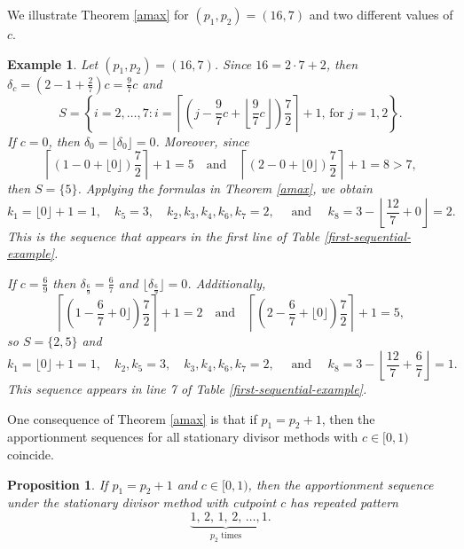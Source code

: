 \documentclass[pdflatex,sn-mathphys-num]{sn-jnl}
\theoremstyle{thmstyleone}%
\newtheorem{proposition}{Proposition}%
\theoremstyle{thmstyletwo}%
\newtheorem{example}{Example}%
\theoremstyle{thmstylethree}%
\begin{document}
 We illustrate Theorem \ref{amax} for $(p_1, p_2)=(16,7)$ and two different values of $c$.
 
 \begin{example}
Let $(p_1, p_2)=(16,7)$. Since $16 = 2 \cdot 7+2$, then $\delta_c =\left(2-1+ \frac{2}{7}\right)c = \frac{9}{7}c$ and 
$$S = \left\{i = 2, \ldots, 7 : i = \left\lceil \left(j- \textstyle\frac{9}{7}c+ \left\lfloor  \textstyle\frac{9}{7}c \right\rfloor \right)\textstyle\frac{7}{2} \right\rceil + 1 \mbox{, for  } j = 1, 2\right\}.$$
If $c=0$, then $\delta_0 = \lfloor \delta_0 \rfloor=0$. Moreover, since
$$ \left\lceil (1- 0+ \lfloor  0 \rfloor)\textstyle\frac{7}{2} \right\rceil+1 = 5 \quad \mbox{and} \quad   \left\lceil (2-0+ \lfloor  0 \rfloor)\textstyle\frac{7}{2} \right\rceil+1=8>7, $$
then $S = \{5\}$. 
  Applying the formulas in Theorem \ref{amax}, we obtain
 $$k_1  = \lfloor  0 \rfloor + 1=1, \quad  k_5=3, \quad k_2, k_3, k_4, k_6, k_7=2,  \quad \mbox{ and } \quad  k_{8} =3 - \left\lfloor \textstyle\frac{12}{7}+0\right\rfloor= 2.$$
This is the sequence that appears in the first line of Table \ref{first-sequential-example}.

If $c=\frac{6}{9}$ then $\delta_{\frac{6}{9}}=\frac{6}{7}$ and  $\lfloor \delta_{\frac{6}{9}} \rfloor =0$. Additionally, 
$$ \left\lceil \left(1- \textstyle\frac{6}{7}+ 0 \rfloor \right)\textstyle\frac{7}{2} \right\rceil+1 = 2 \quad \mbox{and} \quad   \left\lceil \left(2-\textstyle\frac{6}{7}+ \lfloor  0 \rfloor \right)\textstyle\frac{7}{2} \right\rceil+1=5, $$
so $S = \{2, 5\}$ and
 $$k_1  = \lfloor  0 \rfloor + 1=1, \quad  k_2, k_5=3, \quad k_3, k_4, k_6, k_7=2,  \quad \mbox{ and } \quad  k_{8} =3 - \left\lfloor \textstyle\frac{12}{7}+\textstyle\frac{6}{7}\right\rfloor= 1.$$
This sequence appears in line 7 of Table \ref{first-sequential-example}.
 \end{example}
 
 
One  consequence of Theorem \ref{amax} is that if $p_1=p_2+1$, then the apportionment sequences for all stationary divisor methods with $c \in [0, 1)$ coincide. 

\begin{proposition}\label{diff_one}
If $p_1=p_2+1$ and $c \in [0, 1)$, then the apportionment sequence under the stationary divisor method with cutpoint $c$ has repeated pattern
\begin{equation*} \underbrace{1, \,2,\,1, \, 2, \, \ldots,}_{p_2 \text{ times}} 1.
\end{equation*} \end{proposition}
\end{document}
